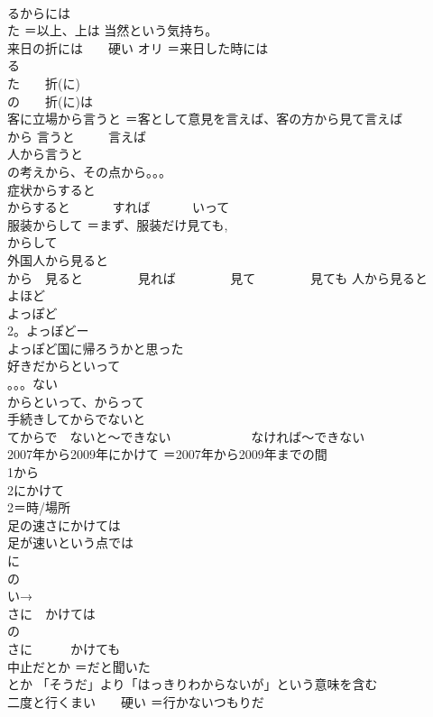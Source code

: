 \documentclass[8pt]{extreport}
\begin{document}
\begin{CJK}{UTF8}{min}
\\	るからには 
\\	た ＝以上、上は 当然という気持ち。
\\	来日の折には　　硬い	オリ ＝来日した時には 
\\	る 
\\	た　　折(に) 
\\	の　　折(に)は
\\	客に立場から言うと	＝客として意見を言えば、客の方から見て言えば 
\\	から 言うと 　　 言えば 
\\	人から言うと 
\\	の考えから、その点から。。。
\\	症状からすると	
\\	からすると 　　　すれば 　　　いって
\\	服装からして	＝まず、服装だけ見ても, 
\\	からして
\\	外国人から見ると	
\\	から　見ると 　　　　見れば 　　　　見て 　　　　見ても 人から見ると　
\\	よほど
\\	よっぽど	
\\	2。よっぽどー
\\	よっぽど国に帰ろうかと思った
\\	好きだからといって	
\\	。。。ない 
\\	からといって、からって
\\	手続きしてからでないと	
\\	てからで　ないと〜できない 　　　　　　なければ〜できない
\\	2007年から2009年にかけて	＝2007年から2009年までの間 
\\	1から
\\	2にかけて 
\\	2＝時/場所
\\	足の速さにかけては	
\\	足が速いという点では 
\\	に 
\\	の
\\	い→
\\	さに　かけては 
\\	の
\\	さに　　　かけても
\\	中止だとか	＝だと聞いた 
\\	とか 「そうだ」より「はっきりわからないが」という意味を含む
\\	二度と行くまい　　硬い	＝行かないつもりだ 

\end{CJK}
\end{document}
